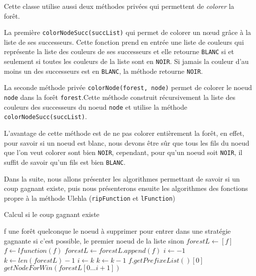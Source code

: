 Cette classe utilise aussi deux méthodes privées qui permettent de \textit{colorer} la forêt.

La première \texttt{colorNodeSucc(succList)} qui permet de colorer un nœud grâce à la liste de ses successeurs. Cette fonction prend en entrée une liste de couleurs qui représente la liste des couleurs de ses successeurs et elle retourne \texttt{BLANC} si et seulement si toutes les couleurs de la liste sont en \texttt{NOIR}. Si jamais la couleur d'au moins un des successeurs est en \texttt{BLANC}, la méthode retourne \texttt{NOIR}.

La seconde méthode privée \texttt{colorNode(forest, node)} permet de colorer le noeud \texttt{node} dans la forêt \texttt{forest}.Cette méthode construit récursivement la liste des couleurs des successeurs du noeud \texttt{node} et utilise la méthode \texttt{colorNodeSucc(succList)}.

L'avantage de cette méthode est de ne pas colorer entièrement la forêt, en effet, pour savoir si un noeud est blanc, nous devons être sûr que tous les fils du noeud que l'on veut colorer sont bien \texttt{NOIR}, cependant, pour qu'un noeud soit \texttt{NOIR}, il suffit de savoir qu'un fils est bien \texttt{BLANC}.

Dans la suite, nous allons présenter les algorithmes permettant de savoir si un coup gagnant existe, puis nous présenterons ensuite les algorithmes des fonctions propre à la méthode Ulehla (\texttt{ripFunction} et \texttt{lFunction})
\clearpage
\begin{algorithm}[hbt]
  \caption{Calcul si le coup gagnant existe}
  \begin{algorithmic}
    \REQUIRE f une forêt quelconque
    \ENSURE le noeud à supprimer pour entrer dans une stratégie gagnante si c'est possible, le premier noeud de la liste sinon
    \STATE $forestL \leftarrow [f]$
      \STATE $f \leftarrow lfunction(f)$
      \STATE $forestL \leftarrow forestL.append(f)$
    \ENDWHILE
    \STATE $i \leftarrow -1$
    \STATE $k \leftarrow len(forestL) - 1$
        \STATE $i \leftarrow k$
      \ENDIF
      \STATE $k \leftarrow k - 1$
    \ENDWHILE
      \RETURN $f.getPrefixeList()[0]$
    \ELSE
      \RETURN $getNodeForWin(forestL[0...i + 1])$
    \ENDIF
  \end{algorithmic}
\end{algorithm}

